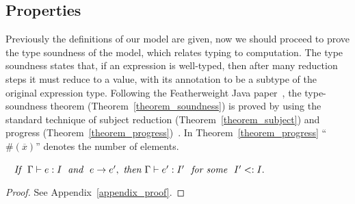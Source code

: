 \begin{comment}
\begin{figure*}[t]
\begin{mathpar}
\end{mathpar}
\caption{Congruence.}\label{fig:congruence}
\end{figure*}
\end{comment}


\subsection{Properties}
Previously the definitions of our model are given, now we should proceed to prove the type soundness of 
the model, which relates typing to computation. The type soundness states that, if an expression is 
well-typed, then after many reduction steps it must reduce to a value, with its annotation to be a subtype of the original expression type.
Following the Featherweight Java paper~\cite{Igarashi01FJ}, the type-soundness theorem 
(Theorem~\ref{theorem_soundness}) is proved by using the standard technique of subject reduction (Theorem~\ref{theorem_subject})
and progress (Theorem~\ref{theorem_progress})~\cite{Wright1994}. In Theorem~\ref{theorem_progress} ``$\#(\overline{x})$'' denotes the number of
elements.

\begin{theorem}~\label{theorem_subject}
$\textit{If } \ \judgeewf \Gamma {e : I} \; \textit{ and } \ e \rightarrow e',\ 
\textit{then } \judgeewf \Gamma {e' : I'} \ \textit{ for some } \ I' <: I.$
\end{theorem}
\begin{proof}
See Appendix~\ref{appendix_proof}.
\end{proof}

